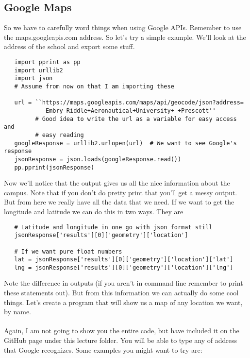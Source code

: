 \documentclass[11pt]{article}   %
\begin{document}
\subsection*{Google Maps}
So we have to carefully word things when using Google APIs.  Remember to use the maps.googleapis.com address.  So let's try a simple example.  We'll look at the address of the school and export some stuff.
\begin{tcolorbox}
   \begin{lstlisting}
   import pprint as pp
   import urllib2
   import json
   # Assume from now on that I am importing these

   url = ``https://maps.googleapis.com/maps/api/geocode/json?address=
            Embry-Riddle+Aeronautical+University+-+Prescott''
         # Good idea to write the url as a variable for easy access and
         # easy reading
   googleResponse = urllib2.urlopen(url)  # We want to see Google's response
   jsonResponse = json.loads(googleResponse.read())
   pp.pprint(jsonResponse)

   \end{lstlisting}
\end{tcolorbox}
Now we'll notice that the output gives us all the nice information about the campus.  Note that if you don't do pretty print that you'll get a messy output.  But from here we really have all the data that we need.  If we want to
get the longitude and latitude we can do this in two ways.  They are
\begin{tcolorbox}
   \begin{lstlisting}
   # Latitude and longitude in one go with json format still
   jsonResponse['results'][0]['geometry']['location']

   # If we want pure float numbers
   lat = jsonResponse['results'][0]['geometry']['location']['lat']
   lng = jsonResponse['results'][0]['geometry']['location']['lng']
   \end{lstlisting}
\end{tcolorbox}
Note the difference in outputs (if you aren't in command line remember to print these statements out).  But from this information we can actually do some cool things.  Let's create a program that will show us a map of any location we
want, by name.
\\\\
Again, I am not going to show you the entire code, but have included it on the GitHub page under this lecture folder.  You will be able to type any of address that Google recognizes.  Some examples you might want to try are:
\end{document}
